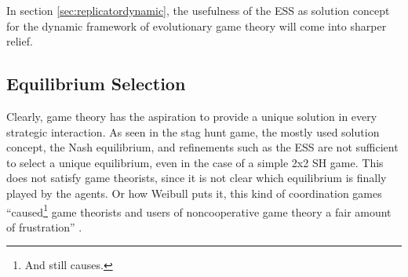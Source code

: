 \documentclass[11pt]{article}
\begin{document}
In section \ref{sec:replicatordynamic}, the usefulness of the ESS as solution
concept for the dynamic framework of evolutionary game theory will come 
into sharper relief.

\subsection{Equilibrium Selection}
\label{sec:equilibriumselection}
Clearly, game theory has the aspiration to provide a unique solution in every
strategic interaction.
As seen in the stag hunt game, the mostly used solution concept, 
the Nash equilibrium, and refinements such as the ESS are
not sufficient to select a unique equilibrium, even in the case of a simple
2x2 SH game. This does not satisfy game theorists, since it is not clear which
equilibrium is finally played by the agents. Or how 
Weibull puts it, this kind of coordination games 
``caused\footnote{And still causes.} game theorists and users of 
noncooperative game theory a fair amount of frustration'' 
\parencite[30]{weibull_evolutionary_1997}. 
\end{document}
